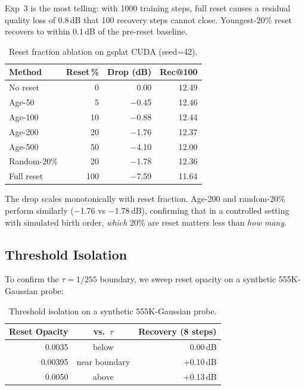\documentclass[runningheads]{llncs}
\begin{document}
Exp~3 is the most telling: with 1000 training steps, full reset causes a residual quality loss of 0.8\,dB that 100 recovery steps cannot close. Youngest-20\% reset recovers to within 0.1\,dB of the pre-reset baseline.

\begin{table}[t]
\centering
\small
\setlength{\tabcolsep}{4pt}
\caption{Reset fraction ablation on gsplat CUDA (seed=42).}
\label{tab:ablation}
\begin{tabular}{@{}lrrr@{}}
\toprule
Method & Reset\,\% & Drop (dB) & Rec@100 \\
\midrule
No reset & 0 & 0.00 & 12.49 \\
Age-50 & 5 & $-$0.45 & 12.46 \\
Age-100 & 10 & $-$0.88 & 12.44 \\
Age-200 & 20 & $-$1.76 & 12.37 \\
Age-500 & 50 & $-$4.10 & 12.00 \\
Random-20\% & 20 & $-$1.78 & 12.36 \\
Full reset & 100 & $-$7.59 & 11.64 \\
\bottomrule
\end{tabular}
\end{table}

The drop scales monotonically with reset fraction. Age-200 and random-20\% perform similarly ($-$1.76 vs $-$1.78\,dB), confirming that in a controlled setting with simulated birth order, \emph{which} 20\% are reset matters less than \emph{how many}.

\subsection{Threshold Isolation}

To confirm the $\tau = 1/255$ boundary, we sweep reset opacity on a synthetic 555K-Gaussian probe:

\begin{table}[h]
\centering
\small
\caption{Threshold isolation on a synthetic 555K-Gaussian probe.}
\label{tab:threshold}
\begin{tabular}{@{}rcr@{}}
\toprule
Reset Opacity & vs.\ $\tau$ & Recovery (8 steps) \\
\midrule
0.0035 & below & 0.00\,dB \\
0.00395 & near boundary & +0.10\,dB \\
0.0050 & above & +0.13\,dB \\
\bottomrule
\end{tabular}
\end{table}
\end{document}
